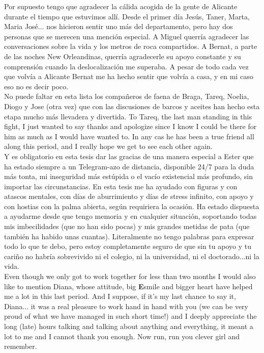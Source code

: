 Por supuesto tengo que agradecer la cálida acogida de la gente de Alicante durante el tiempo que estuvimos allí. Desde el primer día Jesús, Taner, Marta, Maria José... nos hicieron sentir uno más del departamento, pero hay dos personas que se merecen una mención especial. A Miguel querría agradecer las conversaciones sobre la vida y los metros de roca compartidos. A Bernat, a parte de las noches New Orleandinas, querría agradecerle su apoyo constante y su comprensión cuando la deslocalización me superaba. A pesar de todo cada vez que volvía a Alicante Bernat me ha hecho sentir que volvía a casa, y en mi caso eso no es decir poco.\\

No puede faltar en esta lista los compañeros de faena de Braga, Tareq, Noelia, Diogo y Jose (otra vez) que con las discusiones de barcos y aceites han hecho esta etapa mucho más llevadera y divertida. To Tareq, the last man standing in this fight, I just wanted to say thanks and apologize since I know I could be there for him as much as I would have wanted to. In any cas he has been a true friend all along this period, and I really hope we get to see each other again.\\


Y es obligatorio en esta tesis dar las gracias de una manera especial a Ester que ha estado siempre a un Telegram-azo de distancia, disponible 24/7 para la duda más tonta, mi inseguridad más estúpida o el vacío existencial más profundo, sin importar las circunstancias. En esta tesis me ha ayudado con figuras y con atascos mentales, con días de aburrimiento y días de stress infinito, con apoyo y con hostias con la palma abierta, según requiriera la ocasión.
Ha estado dispuesta a ayudarme desde que tengo memoria y en cualquier situación, soportando todas mis imbecilidades (que no han sido pocas) y mis grandes metidas de pata (que también ha habido unas cuantas).
Literalmente no tengo palabras para expresar todo lo que te debo, pero estoy completamente seguro de que sin tu apoyo y tu cariño no habría sobrevivido ni el colegio, ni la universidad, ni el doctorado...ni la vida.\\


Even though we only got to work together for less than two months I would also like to mention Diana, whose attitude, big {\bf E}smile and bigger heart have helped me a lot in this last period.
And I suppose, if it's my last chance to say it, Diana... it was a real pleasure to work hand in hand with you (we can be very proud of what we have managed in such short time!) and I deeply appreciate the long (late) hours talking and talking about anything and everything, it meant a lot to me and I cannot thank you enough. Now run, run you clever girl and remember.\\



